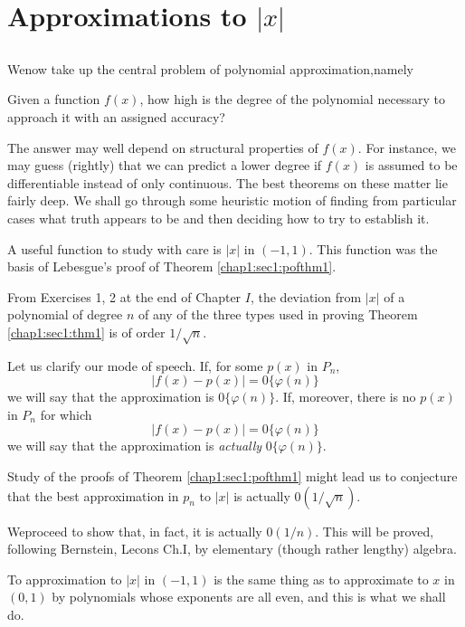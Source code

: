 \chapter{Approximations to \texorpdfstring{$|x|$}{|x|}}\label{chap3}

\setcounter{section}{6}
\section{}\label{chap3:sec7}

We\pageoriginale now take up the central problem of polynomial
  approximation,\break namely 

Given a function $f(x)$, how high is the degree of the polynomial
necessary to approach it with an assigned accuracy? 

The answer may well depend on structural properties of $f(x)$. For
instance, we may guess (rightly) that we can predict a lower degree if
$f(x)$ is assumed to be differentiable instead of only continuous. The
best theorems on these matter lie fairly deep. We shall go through
some heuristic motion of finding from particular cases what truth
appears to be and then deciding how to try to establish it. 

A useful function to study with care is $|x|$ in $(-1,1)$. This
function was the basis of Lebesgue's proof of Theorem \ref{chap1:sec1:pofthm1}. 

From Exercises 1, 2 at the end of Chapter $I$, the deviation from
$|x|$ of a polynomial of degree $n$ of any of the three types used in
proving Theorem \ref{chap1:sec1:thm1} is of order $1/ \sqrt{n}$. 

Let us clarify our mode of speech. If, for some $p(x)$ in $P_n$,
$$
|f(x)-p(x)|=0 \{\varphi (n)\}
$$
we will say that the approximation is $0\{\varphi (n) \}$. If,
moreover, there is no $p(x)$ in $P_n$ for which 
$$
|f(x)-p(x)|=0 \{\varphi (n)\}
$$
we will say that the approximation is \textit{actually} $0 \{\varphi
(n)\}$. 

Study of the proofs of Theorem \ref{chap1:sec1:pofthm1} might lead us to conjecture that
the best approximation in $p_n$ to $|x|$ is actually $0(1/ \surd n)$. 

We\pageoriginale proceed to show that, in fact, it is actually $0(1/n)$. This will
be proved, following Bernstein, Lecons Ch.I, by elementary (though
rather lengthy) algebra. 

To approximation to $|x|$ in $(-1,1)$ is the same thing as to
approximate to $x$ in $(0,1)$ by polynomials whose exponents are all
even, and this is what we shall do. 

